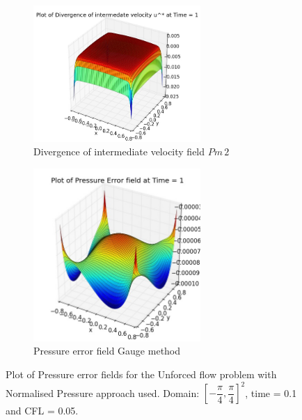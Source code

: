 \begin{figure}[H]
\begin{subfigure}[t]{2.5in}
	\end{subfigure}
	\quad
	\begin{subfigure}[t]{2.5in}
		\centering
		\includegraphics[width=2.5in]{figures/Pm2_unf1_np_div_uvstar_t_1_grid_60.jpg}
		\caption{Divergence of intermediate velocity field $Pm\,2$}\label{fig:6.19b}
	\end{subfigure}
	\quad
	\begin{subfigure}[t]{2.5in}
		\centering
		\includegraphics[width=2.5in]{figures/Gauge_unf1_P_error_t_1_grid_60.jpg}
		\caption{Pressure error field Gauge method }\label{fig:6.19b}
	\end{subfigure}
	\caption{Plot of Pressure error fields for the Unforced flow problem with Normalised Pressure approach used. Domain: $[-\dfrac{\pi}{4}, \dfrac{\pi}{4}]^2$, time = 0.1 and CFL = 0.05.}\label{fig:6.16}
\end{figure}